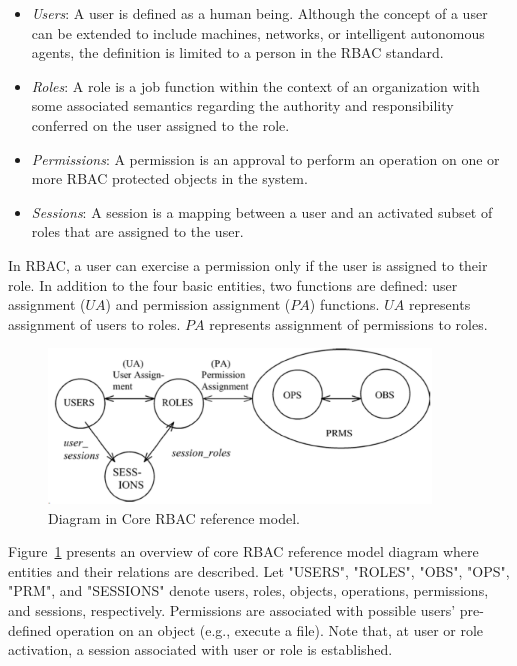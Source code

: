 \begin{itemize}
\setlength{\itemsep}{0.25pt}
\item \emph{Users}: A user is defined as a human being. Although the concept of a user can be extended to include machines, networks, or intelligent autonomous agents, the definition is limited to a person in the RBAC standard. 
\item \emph{Roles}: A role is a job function within the context of an organization with some associated semantics regarding the authority and responsibility conferred on the user assigned to the role.
\item \emph{Permissions}: A permission is an approval to perform an operation on one or more RBAC protected objects in the system.
\item \emph{Sessions}: A session is a mapping between a user and an activated subset of roles that are assigned to the user.
\end{itemize}

In RBAC, a user can exercise a permission only if the user is assigned to their role.
In addition to the four basic entities, two functions are defined:
user assignment ($UA$) and permission assignment ($PA$) functions.
$UA$ represents assignment of users to roles.
$PA$ represents assignment of permissions to roles.

\begin{figure}[ht]
    \centering
        \includegraphics[width=4.0in]{sections/core-model.eps}
    \caption{\label{fig:overview}Diagram in Core RBAC reference model\cite{ferraiolokuhn}.}
\end{figure}

Figure~\ref{fig:overview} presents an overview of core RBAC reference model diagram where entities and their relations are described.
Let "USERS", "ROLES", "OBS", "OPS", "PRM", and "SESSIONS" denote users, roles, objects, operations, permissions, and sessions, respectively.
Permissions are associated with possible users' pre-defined operation on an object (e.g., execute a file).
Note that, at user or role activation, a session associated with user or role is established.


